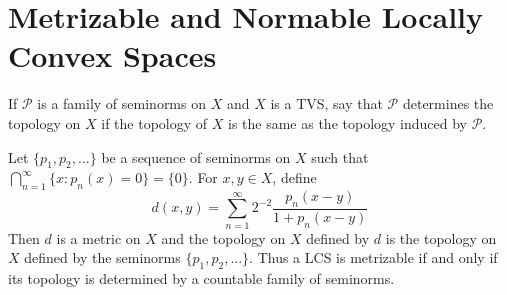 \section{Metrizable and Normable Locally Convex Spaces}
\label{sec:MetrNorm}


If $\mathscr{P}$ is a family of seminorms on $X$ and $X$ is a TVS, say that $\mathscr{P}$ determines the topology on $X$ if the topology of $X$ is the same as the topology induced by $\mathscr{P}$.

\begin{prop}
    Let $\{p_1,p_2,...\}$ be a sequence of seminorms on $X$ such that $\bigcap_{n=1}^{\infty}\{x:p_n(x)=0\} = \{0\}$. For $x,y \in X$, define $$d(x,y) = \sum_{n=1}^{\infty}2^{-2}\frac{p_n(x-y)}{1+p_n(x-y)}$$
    Then $d$ is a metric on $X$ and the topology on $X$ defined by $d$ is the topology on $X$ defined by the seminorms $\{p_1,p_2,...\}$. Thus a LCS is metrizable if and only if its topology is determined by a countable family of seminorms.
\end{prop}
